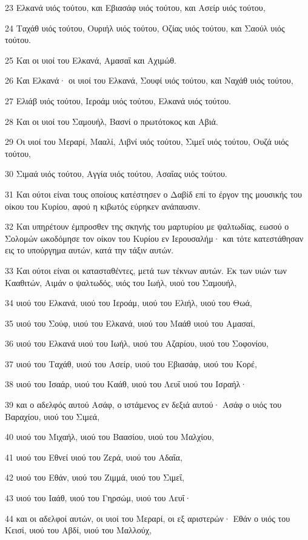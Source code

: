 \par 23 Ελκανά υιός τούτου, και Εβιασάφ υιός τούτου, και Ασείρ υιός τούτου,
\par 24 Ταχάθ υιός τούτου, Ουριήλ υιός τούτου, Οζίας υιός τούτου, και Σαούλ υιός τούτου.
\par 25 Και οι υιοί του Ελκανά, Αμασαΐ και Αχιμώθ.
\par 26 Και Ελκανά· οι υιοί του Ελκανά, Σουφί υιός τούτου, και Ναχάθ υιός τούτου,
\par 27 Ελιάβ υιός τούτου, Ιεροάμ υιός τούτου, Ελκανά υιός τούτου.
\par 28 Και οι υιοί του Σαμουήλ, Βασνί ο πρωτότοκος και Αβιά.
\par 29 Οι υιοί του Μεραρί, Μααλί, Λιβνί υιός τούτου, Σιμεΐ υιός τούτου, Ουζά υιός τούτου,
\par 30 Σιμαά υιός τούτου, Αγγία υιός τούτου, Ασαΐας υιός τούτου.
\par 31 Και ούτοι είναι τους οποίους κατέστησεν ο Δαβίδ επί το έργον της μουσικής του οίκου του Κυρίου, αφού η κιβωτός εύρηκεν ανάπαυσιν.
\par 32 Και υπηρέτουν έμπροσθεν της σκηνής του μαρτυρίου με ψαλτωδίας, εωσού ο Σολομών ωκοδόμησε τον οίκον του Κυρίου εν Ιερουσαλήμ· και τότε κατεστάθησαν εις το υπούργημα αυτών, κατά την τάξιν αυτών.
\par 33 Και ούτοι είναι οι κατασταθέντες, μετά των τέκνων αυτών. Εκ των υιών των Κααθιτών, Αιμάν ο ψαλτωδός, υιός του Ιωήλ, υιού του Σαμουήλ,
\par 34 υιού του Ελκανά, υιού του Ιεροάμ, υιού του Ελιήλ, υιού του Θωά,
\par 35 υιού του Σούφ, υιού του Ελκανά, υιού του Μαάθ υιού του Αμασαί,
\par 36 υιού του Ελκανά υιού του Ιωήλ, υιού του Αζαρίου, υιού του Σοφονίου,
\par 37 υιού του Ταχάθ, υιού του Ασείρ, υιού του Εβιασάφ, υιού του Κορέ,
\par 38 υιού του Ισαάρ, υιού του Καάθ, υιού του Λευΐ υιού του Ισραήλ·
\par 39 και ο αδελφός αυτού Ασάφ, ο ιστάμενος εν δεξιά αυτού· Ασάφ ο υιός του Βαραχίου, υιού του Σιμεά,
\par 40 υιού του Μιχαήλ, υιού του Βαασίου, υιού του Μαλχίου,
\par 41 υιού του Εθνεί υιού του Ζερά, υιού του Αδαΐα,
\par 42 υιού του Εθάν, υιού του Ζιμμά, υιού του Σιμεΐ,
\par 43 υιού του Ιαάθ, υιού του Γηρσώμ, υιού του Λευΐ·
\par 44 και οι αδελφοί αυτών, οι υιοί του Μεραρί, οι εξ αριστερών· Εθάν ο υιός του Κεισί, υιού του Αβδί, υιού του Μαλλούχ,

